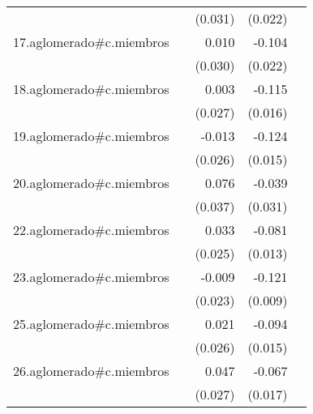 {\begin{longtable}{l*{4}{D{.}{.}{-1}}}
            &                     &     (0.031)         &     (0.022)         &                     \\
\addlinespace
17.aglomerado#c.miembros&                     &       0.010         &      -0.104\sym{***}&                     \\
            &                     &     (0.030)         &     (0.022)         &                     \\
\addlinespace
18.aglomerado#c.miembros&                     &       0.003         &      -0.115\sym{***}&                     \\
            &                     &     (0.027)         &     (0.016)         &                     \\
\addlinespace
19.aglomerado#c.miembros&                     &      -0.013         &      -0.124\sym{***}&                     \\
            &                     &     (0.026)         &     (0.015)         &                     \\
\addlinespace
20.aglomerado#c.miembros&                     &       0.076\sym{*}  &      -0.039         &                     \\
            &                     &     (0.037)         &     (0.031)         &                     \\
\addlinespace
22.aglomerado#c.miembros&                     &       0.033         &      -0.081\sym{***}&                     \\
            &                     &     (0.025)         &     (0.013)         &                     \\
\addlinespace
23.aglomerado#c.miembros&                     &      -0.009         &      -0.121\sym{***}&                     \\
            &                     &     (0.023)         &     (0.009)         &                     \\
\addlinespace
25.aglomerado#c.miembros&                     &       0.021         &      -0.094\sym{***}&                     \\
            &                     &     (0.026)         &     (0.015)         &                     \\
\addlinespace
26.aglomerado#c.miembros&                     &       0.047         &      -0.067\sym{***}&                     \\
            &                     &     (0.027)         &     (0.017)         &                     \\

\end{longtable}}
